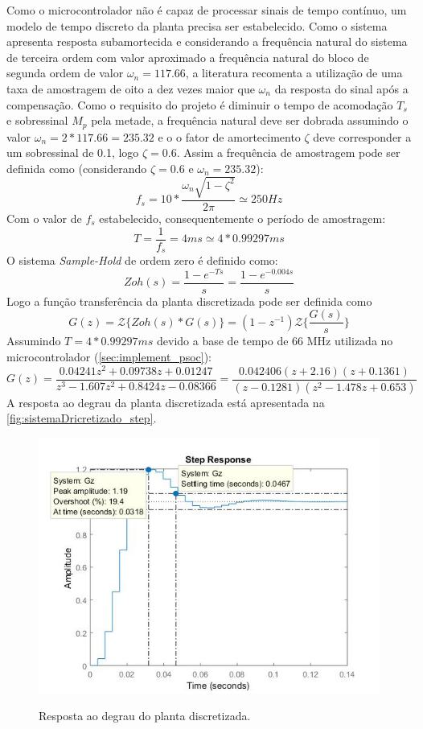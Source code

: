 \documentclass[
	article,			%
	11pt,				%
	oneside,			%
	a4paper,			%
	english,			%
	brazil,				%
	sumario=tradicional
	]{abntex2}
\begin{document}
Como o microcontrolador não é capaz de processar sinais de tempo contínuo, um modelo de tempo discreto da planta precisa ser estabelecido.
Como o sistema apresenta resposta subamortecida e considerando a frequência natural do sistema de terceira ordem com valor aproximado a frequência natural do bloco de segunda ordem de valor $\omega_n = 117.66$, a literatura recomenta a utilização de uma taxa de amostragem de oito a dez vezes maior que $\omega_n$ da resposta do sinal após a compensação\cite{Ogata_DTC_1995}.
Como o requisito do projeto é diminuir o  tempo de acomodação $T_s$ e sobressinal $M_p$ pela metade, a frequência natural deve ser dobrada assumindo o valor $\omega_n = 2*117.66 = 235.32$ e o o fator de amortecimento $\zeta$ deve corresponder a um sobressinal de 0.1, logo $\zeta = 0.6$.
Assim a frequência de amostragem pode ser definida como (considerando $\zeta=0.6$ e $\omega_n = 235.32$):
$$
	f_s = 10 * \frac{\omega_n\sqrt{1-\zeta^2}}{2\pi} \simeq 250 Hz
$$
Com o valor de $f_s$ estabelecido, consequentemente o período de amostragem: $$T=\frac{1}{f_s} = 4 ms \simeq 4 * 0.99297 ms$$
O sistema \textit{Sample-Hold} de ordem zero é definido como:
$$Zoh(s)=\frac{1-e^{-Ts}}{s} = \frac{1-e^{-0.004s}}{s}$$
Logo a função transferência da planta discretizada pode ser definida como
$$G(z)=\mathscr{Z}\{Zoh(s)*G(s)\}=(1-z^{-1})\mathscr{Z}\{\frac{G(s)}{s}\}$$
Assumindo $T = 4 * 0.99297 ms$ devido a base de tempo de 66 MHz utilizada no microcontrolador (\autoref{sec:implement_psoc}):
$$G(z) =\frac{0.04241z^2 + 0.09738z + 0.01247}{z^3 - 1.607z^2 + 0.8424z - 0.08366}=\frac{0.042406(z+2.16)(z+0.1361)}{(z-0.1281)(z^2 - 1.478z + 0.653)}$$
A resposta ao degrau da planta discretizada está apresentada na \autoref{fig:sistemaDricretizado_step}.

\begin{figure}[htb!]
	\centering
	\caption{Resposta ao degrau do planta discretizada.}
	\includegraphics[scale=0.46]{./img/sistemaDricretizado_step.JPG}
	\label{fig:sistemaDricretizado_step}
\end{figure}
\end{document}
